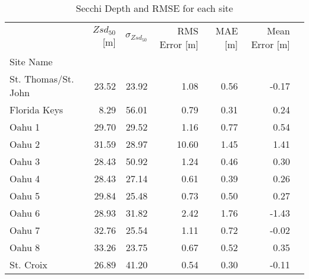\begin{table}
    \centering
    \caption{Secchi Depth and RMSE for each site}
    \label{tab:ocean_color_summary_by_site}
    \begin{tabular}{lrrrrrr}
        \toprule
        {}                  & $Zsd_{50}$[m] & $\sigma_{Zsd_{50}}$ & RMS Error [m] & MAE [m] & Mean Error [m] \\
        Site Name           &               &                        &               &         &                \\
        \midrule
        St. Thomas/St. John & 23.52         & 23.92                  & 1.08          & 0.56    & -0.17          \\
        Florida Keys        & 8.29          & 56.01                  & 0.79          & 0.31    & 0.24           \\
        Oahu 1              & 29.70         & 29.52                  & 1.16          & 0.77    & 0.54           \\
        Oahu 2              & 31.59         & 28.97                  & 10.60         & 1.45    & 1.41           \\
        Oahu 3              & 28.43         & 50.92                  & 1.24          & 0.46    & 0.30           \\
        Oahu 4              & 28.43         & 27.14                  & 0.61          & 0.39    & 0.26           \\
        Oahu 5              & 29.84         & 25.48                  & 0.73          & 0.50    & 0.27           \\
        Oahu 6              & 28.93         & 31.82                  & 2.42          & 1.76    & -1.43          \\
        Oahu 7              & 32.76         & 25.54                  & 1.11          & 0.72    & -0.02          \\
        Oahu 8              & 33.26         & 23.75                  & 0.67          & 0.52    & 0.35           \\
        St. Croix           & 26.89         & 41.20                  & 0.54          & 0.30    & -0.11          \\
        \bottomrule
    \end{tabular}
\end{table}
